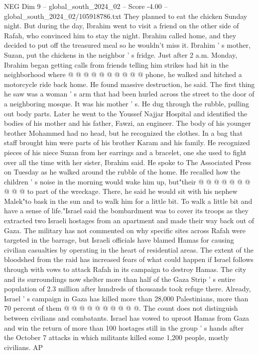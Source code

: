 \begin{textsample}{NEG Dim 9 – global\_south\_2024\_02 – Score -4.00 – global\_south\_2024\_02/105918786.txt}
They planned to eat the chicken Sunday night.
But during the day, Ibrahim went to visit a friend on the other side of Rafah, who convinced him to stay the night.
Ibrahim called home, and they decided to put off the treasured meal so he wouldn't miss it.
Ibrahim ' s mother, Suzan, put the chickens in the neighbor ' s fridge.
Just after 2 a.m.
Monday, Ibrahim began getting calls from friends telling him strikes had hit in the neighborhood where @ @ @ @ @ @ @ @ @ @ phone, he walked and hitched a motorcycle ride back home.
He found massive destruction, he said.
The first thing he saw was a woman ' s arm that had been hurled across the street to the door of a neighboring mosque.
It was his mother ' s.
He dug through the rubble, pulling out body parts.
Later he went to the Youssef Najjar Hospital and identified the bodies of his mother and his father, Fawzi, an engineer.
The body of his younger brother Mohammed had no head, but he recognized the clothes.
In a bag that staff brought him were parts of his brother Karam and his family.
He recognized pieces of his niece Suzan from her earrings and a bracelet, one she used to fight over all the time with her sister, Ibrahim said.
He spoke to The Associated Press on Tuesday as he walked around the rubble of the home.
He recalled how the children ' s noise in the morning would wake him up, but"their @ @ @ @ @ @ @ @ @ @ to part of the wreckage.
There, he said he would sit with his nephew Malek"to bask in the sun and to walk him for a little bit.
To walk a little bit and have a sense of life."Israel said the bombardment was to cover its troops as they extracted two Israeli hostages from an apartment and made their way back out of Gaza.
The military has not commented on why specific sites across Rafah were targeted in the barrage, but Israeli officials have blamed Hamas for causing civilian casualties by operating in the heart of residential areas.
The extent of the bloodshed from the raid has increased fears of what could happen if Israel follows through with vows to attack Rafah in its campaign to destroy Hamas.
The city and its surroundings now shelter more than half of the Gaza Strip ' s entire population of 2.3 million after hundreds of thousands took refuge there.
Already, Israel ' s campaign in Gaza has killed more than 28,000 Palestinians, more than 70 percent of them @ @ @ @ @ @ @ @ @ @.
The count does not distinguish between civilians and combatants.
Israel has vowed to uproot Hamas from Gaza and win the return of more than 100 hostages still in the group ' s hands after the October 7 attacks in which militants killed some 1,200 people, mostly civilians.
AP

\end{textsample}
